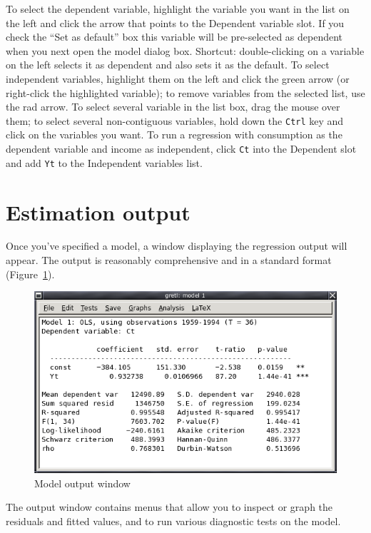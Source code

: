 To select the dependent variable, highlight the variable you want in
the list on the left and click the arrow that points to the Dependent
variable slot.  If you check the ``Set as default'' box this variable
will be pre-selected as dependent when you next open the model dialog
box. Shortcut: double-clicking on a variable on the left selects it as
dependent and also sets it as the default. To select independent
variables, highlight them on the left and click the green arrow (or
right-click the highlighted variable); to remove variables from the
selected list, use the rad arrow.  To select several variable in
the list box, drag the mouse over them; to select several
non-contiguous variables, hold down the \verb+Ctrl+ key and click on
the variables you want.  To run a regression with consumption as the
dependent variable and income as independent, click \verb+Ct+ into the
Dependent slot and add \verb+Yt+ to the Independent variables list.


\section{Estimation output}
\label{est-output}

Once you've specified a model, a window displaying the regression
output will appear.  The output is reasonably comprehensive and in a
standard format (Figure~\ref{fig-modelwin}).
    
\begin{figure}[htbp]
  \begin{center}
    \includegraphics[scale=0.5]{figures/modelwin}
  \end{center}
  \caption{Model output window}
  \label{fig-modelwin}
\end{figure}

The output window contains menus that allow you to inspect or graph
the residuals and fitted values, and to run various diagnostic tests
on the model. 

